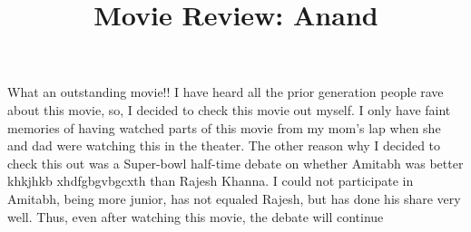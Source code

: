 \documentclass[12pt, a4paper]{article}
\title{Movie Review: Anand}
\author{}
\date{}
\begin{document}
\maketitle

What an outstanding movie!! I have heard all the prior generation people rave about this movie, so, I decided to check this movie out myself. I only have faint memories of having watched parts of this movie from my mom's lap when she and dad were watching this
in the theater. The other reason why I decided to check this out was a Super-bowl half-time debate on whether Amitabh was better
khkjhkb
xhdfgbgvbgcxth
than Rajesh Khanna. I could not participate in  Amitabh, being more junior, has not equaled Rajesh, but has done his share very well. Thus, even after watching this movie, the debate will continue \par
\end{document}
